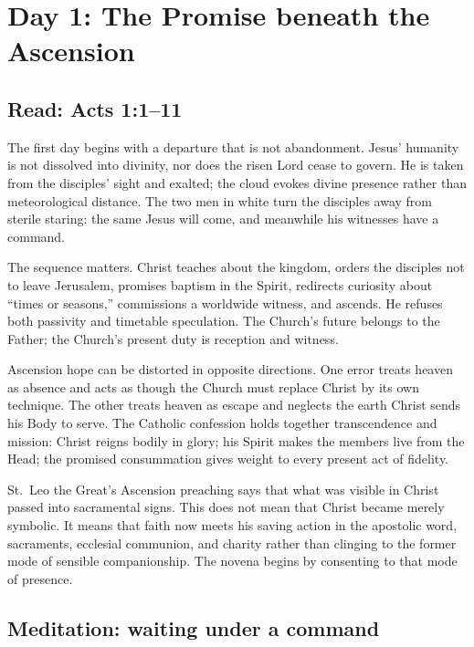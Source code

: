 \section{Day 1: The Promise beneath the Ascension}


\subsection{Read: Acts 1:1--11}

The first day begins with a departure that is not abandonment. Jesus' humanity is not dissolved into divinity, nor does the risen Lord cease to govern. He is taken from the disciples' sight and exalted; the cloud evokes divine presence rather than meteorological distance. The two men in white turn the disciples away from sterile staring: the same Jesus will come, and meanwhile his witnesses have a command.

The sequence matters. Christ teaches about the kingdom, orders the disciples not to leave Jerusalem, promises baptism in the Spirit, redirects curiosity about “times or seasons,” commissions a worldwide witness, and ascends. He refuses both passivity and timetable speculation. The Church's future belongs to the Father; the Church's present duty is reception and witness.

Ascension hope can be distorted in opposite directions. One error treats heaven as absence and acts as though the Church must replace Christ by its own technique. The other treats heaven as escape and neglects the earth Christ sends his Body to serve. The Catholic confession holds together transcendence and mission: Christ reigns bodily in glory; his Spirit makes the members live from the Head; the promised consummation gives weight to every present act of fidelity.

St.~Leo the Great's Ascension preaching says that what was visible in Christ passed into sacramental signs. This does not mean that Christ became merely symbolic. It means that faith now meets his saving action in the apostolic word, sacraments, ecclesial communion, and charity rather than clinging to the former mode of sensible companionship. The novena begins by consenting to that mode of presence.

\subsection{Meditation: waiting under a command}

